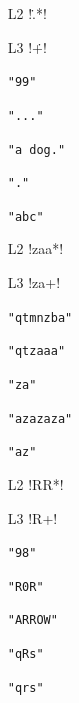 \begin{multicols}{3}
\begin{itemize}[noitemsep,topsep=0pt]
\item[L2] \cverb!\..*!
\item[L3] \cverb!\.+!
\item[] \verb|"99"|
\item[] \verb|"..."|
\item[] \verb|"a dog."|
\item[] \verb|"."|
\item[] \verb|"abc"|
\item[L2] \cverb!zaa*!
\item[L3] \cverb!za+!
\item[] \verb|"qtmnzba"|
\item[] \verb|"qtzaaa"|
\item[] \verb|"za"|
\item[] \verb|"azazaza"|
\item[] \verb|"az"|
\item[L2] \cverb!RR*!
\item[L3] \cverb!R+!
\item[] \verb|"98"|
\item[] \verb|"R0R"|
\item[] \verb|"ARROW"|
\item[] \verb|"qRs"|
\item[] \verb|"qrs"|
\end{itemize}
\end{multicols}
\pagebreak

